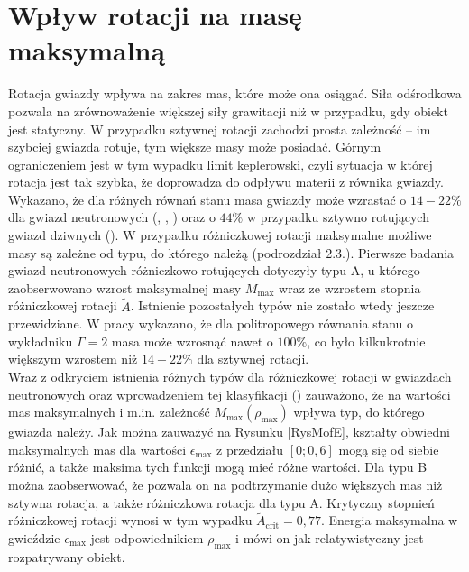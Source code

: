 \documentclass{bachelor_thesis}
\begin{document}
    \section{Wpływ rotacji na masę maksymalną}
        Rotacja gwiazdy wpływa na zakres mas, które może ona osiągać. Siła odśrodkowa pozwala na zrównoważenie większej siły grawitacji niż w przypadku, gdy obiekt jest statyczny. W przypadku sztywnej rotacji zachodzi prosta zależność -- im szybciej gwiazda rotuje, tym większe masy może posiadać. Górnym ograniczeniem jest w tym wypadku limit keplerowski, czyli sytuacja w której rotacja jest tak szybka, że doprowadza do odpływu materii z równika gwiazdy. Wykazano, że dla różnych równań stanu masa gwiazdy może wzrastać o $14-22 \%$ dla gwiazd neutronowych (\citealp{Cook1992}, \citealp{Cook1994a}, \citealp{Cook1994b}) oraz o $44\%$ w przypadku sztywno rotujących gwiazd dziwnych (\citealp{Rosinska2000}).
        \indent W przypadku różniczkowej rotacji maksymalne możliwe masy są zależne od typu, do którego należą (podrozdział 2.3.). Pierwsze badania gwiazd neutronowych różniczkowo rotujących dotyczyły typu A, u którego zaobserwowano wzrost maksymalnej masy $M_\textrm{max}$ wraz ze wzrostem stopnia różniczkowej rotacji $\tilde{A}$. Istnienie pozostałych typów nie zostało wtedy jeszcze przewidziane. W pracy \cite{Baumgarte2000} wykazano, że dla politropowego równania stanu o wykładniku $\Gamma=2$ masa może wzrosnąć nawet o $100\%$, co było kilkukrotnie większym wzrostem niż $14-22\%$ dla sztywnej rotacji.\\
        \indent Wraz z odkryciem istnienia różnych typów dla różniczkowej rotacji w gwiazdach neutronowych oraz wprowadzeniem tej klasyfikacji (\cite{Ansorg2009}) zauważono, że na wartości mas maksymalnych i m.in. zależność $M_\textrm{max}(\rho_\textrm{max})$ wpływa typ, do którego gwiazda należy. Jak można zauważyć na Rysunku \ref{RysMofE}, kształty obwiedni maksymalnych mas dla wartości $\epsilon_\textrm{max}$ z przedziału $[0;0,6]$ mogą się od siebie różnić, a także maksima tych funkcji mogą mieć różne wartości. Dla typu B można zaobserwować, że pozwala on na podtrzymanie dużo większych mas niż sztywna rotacja, a także różniczkowa rotacja dla typu A. Krytyczny stopnień różniczkowej rotacji wynosi w tym wypadku $\tilde{A}_\textrm{crit}=0,77$. Energia maksymalna w gwieździe $\epsilon_\textrm{max}$ jest odpowiednikiem $\rho_\textrm{max}$ i mówi on jak relatywistyczny jest rozpatrywany obiekt.
\end{document}
